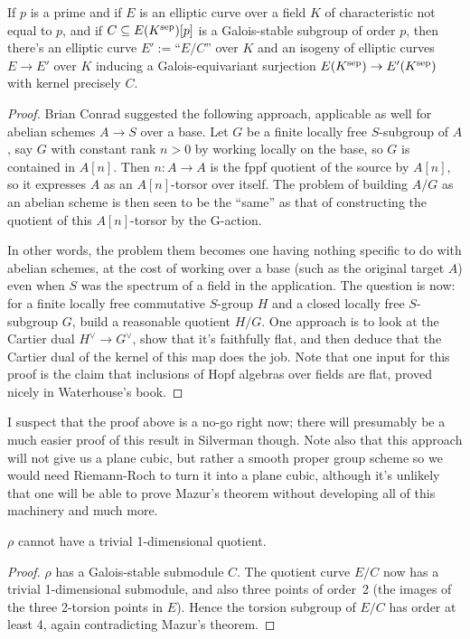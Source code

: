 \begin{theorem}\label{Elliptic_curve_quotient_by_finite_subgroup} If $p$ is a prime and
  if $E$ is an elliptic curve over a field $K$ of characteristic not equal to $p$,
   and if $C\subseteq E(K^{\operatorname{sep}})[p]$ is a Galois-stable
  subgroup of order $p$, then there's an elliptic curve $E':=$``$E/C$'' over $K$ and an isogeny of elliptic 
  curves $E\to E'$ over $K$ inducing a Galois-equivariant surjection $E(K^{\operatorname{sep}})\to E'(K^{\operatorname{sep}})$ 
  with kernel precisely $C$.
\end{theorem}
\begin{proof}
  Brian Conrad suggested the following approach, applicable as well for abelian schemes $A\to S$ 
  over a base.  Let $G$ be a finite locally free $S$-subgroup of $A$, say $G$ with constant 
  rank $n > 0$ by working locally on the base, so $G$ is contained in $A[n]$.  Then 
  $n: A \to A$ is the fppf quotient of the source by $A[n]$, so it expresses $A$ as an 
  $A[n]$-torsor over itself.  The problem of building $A/G$ as an abelian scheme is then 
  seen to be the “same” as that of constructing the quotient of this $A[n]$-torsor by the G-action.

  In other words, the problem them becomes one having nothing specific to do with abelian schemes, 
  at the cost of working over a base (such as the original target $A$) even when $S$ was the 
  spectrum of a field in the application. The question is now: for a finite locally free 
  commutative $S$-group $H$ and a closed locally free $S$-subgroup $G$, build a reasonable quotient 
  $H/G$. One approach is to look at the Cartier dual $H^\vee\to G^\vee$, show that it's faithfully 
  flat, and then deduce that the Cartier dual of the kernel of this map does the job. Note that 
  one input for this proof is the claim that inclusions of Hopf algebras over fields are flat, 
  proved nicely in Waterhouse’s book.
\end{proof}

I suspect that the proof above is a no-go right now; there will presumably be a much easier proof of this result in Silverman though. Note also that this approach will not
give us a plane cubic, but rather a smooth proper group scheme so we would need Riemann-Roch
to turn it into a plane cubic, although it's unlikely that one will be able to prove Mazur's
theorem without developing all of this machinery and much more.

\begin{corollary}\label{Frey_curve_no_trivial_quotient} $\rho$ cannot have a trivial 1-dimensional quotient.
\end{corollary}
\begin{proof} $\rho$ has a Galois-stable submodule $C$. The quotient curve $E/C$ now has
  a trivial 1-dimensional submodule, and also three points of order~2 (the images of the three
  2-torsion points in $E$). Hence the torsion subgroup of $E/C$ has order at least 4\ell{}, 
  again contradicting Mazur's theorem.
\end{proof}

